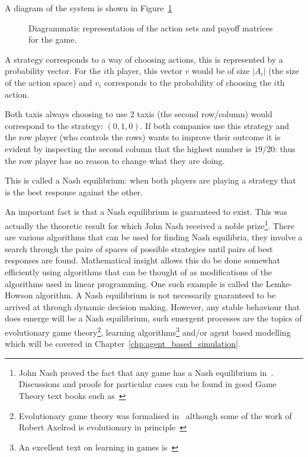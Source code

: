 A diagram of the system is shown in Figure~\ref{fig:taxi-firm-game}

\begin{figure}
\begin{center}

\end{center}
\caption{Diagrammatic representation of the action sets and payoff matrices for
    the game.}
\label{fig:taxi-firm-game}
\end{figure}

A strategy corresponds to a way of choosing actions, this is represented by a
probability vector. For the \(i\)th player, this vector \(v\) would be of size
\(|A_i|\) (the size of the action space) and \(v_i\) corresponds to the
probability of choosing the \(i\)th action.

Both taxis always choosing to use 2 taxis (the second row/column) would
correspond to the strategy: \((0, 1, 0)\).
If both companies use this strategy and the row player (who controls the
rows) wants to improve their outcome it is evident by inspecting the second
column that the highest number is \(19 / 20\): thus the row player has no reason
to change what they are doing.

This is called a Nash equilibrium: when both players are playing a
strategy that is the best response against the other.

An important fact is that a Nash equilibrium is guaranteed to exist.
This was actually the theoretic result for which John Nash received a noble
prize\footnote{
John Nash proved the fact that any game has a Nash equilibrium
in~\autocite{nash1950equilibrium}. Discussions and proofs for particular cases
can be found in good Game Theory text books such as~\autocite{maschler2013game}
}.
There are various algorithms that can be used for finding Nash equilibria, they involve
a search through the pairs of spaces of possible strategies until pairs of best
responses are found. Mathematical insight allows this do be done somewhat efficiently
using algorithms that can be thought of as modifications of the algorithms used in linear programming.
One such example is called the Lemke-Howson algorithm.
A Nash equilibrium is not necessarily guaranteed to be arrived at through
dynamic decision making. However, any stable
behaviour that does emerge will be a Nash
equilibrium, such emergent processes are the topics of evolutionary game
theory\footnote{
Evolutionary game theory was formalised in~\autocite{smith1974theory} although
some of the work of Robert Axelrod is evolutionary in principle~\autocite{axelrod1981evolution}
},
learning algorithms\footnote{
An excellent text on learning in games is~\autocite{fudenberg1998theory}
}
and/or agent based modelling which will be covered in
Chapter~\ref{chp:agent_based_simulation}.

